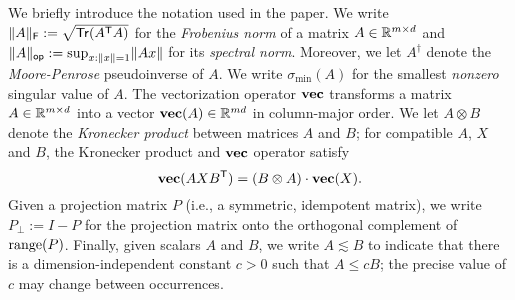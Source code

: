 We briefly introduce the notation used in the paper.
We write $\lVert A\rVert_{\mathsf{F}} := \sqrt{\mathsf{Tr}(A^{\mathsf{T}} A)}$ for the \emph{Frobenius norm} of a matrix $A \in \mathbb{R}^{m \times d}$
and $\lVert A\rVert_{\mathsf{op}} := \sup_{x: \lVert x\rVert = 1} \lVert Ax\rVert$ for its \emph{spectral norm}. Moreover,
we let $A^{\dag}$ denote the \emph{Moore-Penrose} pseudoinverse of $A$.
We write $\sigma_{\min}(A)$ for the smallest \emph{nonzero}
singular value of $A$.
The vectorization operator $\operatorname{\mathbf{vec}}$ transforms
a matrix $A \in \mathbb{R}^{m \times d}$ into a vector $\mathbf{vec}(A) \in \mathbb{R}^{md}$
in column-major order.
We let $A \otimes B$ denote the \emph{Kronecker product} between matrices $A$ and $B$; for
compatible $A$, $X$ and $B$, the Kronecker product and $\operatorname{\mathbf{vec}}$ operator satisfy
\begin{equation}
	\operatorname{\mathbf{vec}}(AXB^{\mathsf{T}}) = (B \otimes A) \cdot \operatorname{\mathbf{vec}}(X). \label{eq:kronecker-product-and-vectorization}
\end{equation}
Given a projection matrix $P$ (i.e., a symmetric, idempotent matrix),
we write $P_{\perp} := I - P$ for the projection matrix onto the orthogonal complement of $\mathrm{range}(P)$.
Finally, given scalars $A$ and $B$, we
write $A \lesssim B$ to indicate that there is a dimension-independent constant
$c > 0$ such that $A \leq c B$; the precise value of $c$ may change between occurrences.

